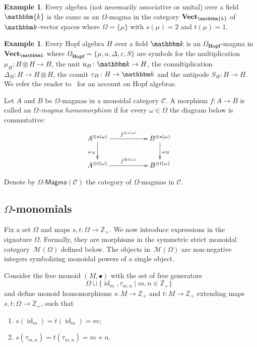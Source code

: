\documentclass[12pt, reqno, a4paper]{amsart}
\theoremstyle{plain}
\theoremstyle{remark}
\theoremstyle{definition}
\newtheorem{example}[theorem]{Example}
\numberwithin{equation}{section}
\DeclareMathOperator{\id}{id}
\begin{document}
\begin{example}\label{ExampleAlgebraOmega}
	Every algebra (not necessarily associative or unital)  over a field $\mathbbm{k}$
	is the same as an $\Omega$-magma in the category $\mathbf{Vect}_\mathbbm{k}$ of $\mathbbm k$-vector spaces where $\Omega=\lbrace\mu \rbrace$ with $s(\mu)=2$ and $t(\mu)=1$.
\end{example}

\begin{example}\label{ExampleHopfAlgebraOmega}
	Every Hopf algebra $H$ over a field $\mathbbm k$ is an $\Omega_\mathbf{Hopf}$-magma in $\mathbf{Vect}_{\mathbbm k}$
	where $\Omega_\mathbf{Hopf}=\lbrace \mu, u, \Delta, \varepsilon, S \rbrace$ are symbols for
	the multiplication $\mu_H \colon H \otimes H \to H$, the unit $u_H \colon \mathbbm k \to H$,
	the comultiplication $\Delta_H \colon H  \to H \otimes H$,
	the counit $\varepsilon_H \colon H  \to \mathbbm k$ and the antipode $S_H \colon H \to H$.
	We refer the reader to~\cite{DNR, Montgomery}
	for an account on Hopf algebras.
\end{example}

Let $A$ and $B$ be $\Omega$-magmas in a monoidal category $\mathcal C$. A morphism $f\colon A \to B$ is called an \textit{$\Omega$-magma homomorphism}
if for every $\omega \in \Omega$ the diagram below is commutative:
$$
\xymatrix{
	A^{\otimes s(\omega)} \ar[rr]^-{f^{\otimes s(\omega)}} \ar[d]_{\omega_A} && B^{\otimes s(\omega)} \ar[d]^{\omega_B}\\
	A^{\otimes t(\omega)} \ar[rr]^-{f^{\otimes t(\omega)}}  && B^{\otimes t(\omega)} 
}
$$

Denote by $\Omega\text{-}\mathsf{Magma}(\mathcal C)$ the category of $\Omega$-magmas in $\mathcal C$.

\subsection{$\Omega$-monomials}
Fix a set $\Omega$ and maps $s,t \colon \Omega \to \mathbb Z_+$. We now introduce expressions in the signature $\Omega$. Formally, they are morphisms in the symmetric strict monoidal category~$\mathcal M(\Omega)$ defined below.
The objects in~$\mathcal M(\Omega)$ are non-negative integers symbolizing monoidal powers of a single object.

Consider the free monoid $(M, \bullet)$ with the set of free generators $$\Omega \sqcup \lbrace \id_m, \tau_{m,n} \mid m,n \in \mathbb Z_+ \rbrace$$ and
define monoid homomorphisms $s \colon M \to\mathbb  Z_+$
and $t \colon M \to \mathbb Z_+$
extending maps $s, t \colon \Omega \to \mathbb Z_+$, such that
\begin{enumerate}
\item $s(\id_m)=t(\id_m)=m$;
\item $s(\tau_{m,n})=t(\tau_{m,n})=m+n$.
\end{enumerate}
\end{document}
